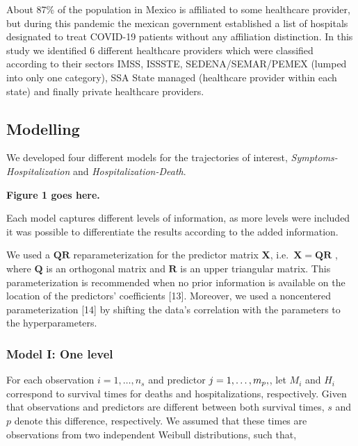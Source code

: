 \documentclass[10pt,letterpaper]{article}
\begin{document}
About 87\% of the population in Mexico is affiliated to some healthcare
provider, but during this pandemic the mexican government established a
list of hospitals designated to treat COVID-19 patients without any
affiliation distinction. In this study we identified 6 different
healthcare providers which were classified according to their sectors
IMSS, ISSSTE, SEDENA/SEMAR/PEMEX (lumped into only one category), SSA
State managed (healthcare provider within each state) and finally
private healthcare providers.

\hypertarget{modelling}{%
\subsection{Modelling}\label{modelling}}

We developed four different models for the trajectories of interest,
\emph{Symptoms-Hospitalization} and \emph{Hospitalization-Death}.
\vspace{5mm}

\begin{center}
\textbf{Figure 1 goes here.}
\end{center}

\vspace{5mm}

Each model captures different levels of information, as more levels were
included it was possible to differentiate the results according to the
added information.

We used a \(\mathbf{QR}\) reparameterization for the predictor matrix
\(\mathbf{X}\), i.e.~\(\mathbf{X}=\mathbf{QR}\) , where \(\mathbf{Q}\)
is an orthogonal matrix and \(\mathbf{R}\) is an upper triangular
matrix. This parameterization is recommended when no prior information
is available on the location of the predictors' coefficients {[}13{]}.
Moreover, we used a noncentered parameterization {[}14{]} by shifting
the data's correlation with the parameters to the hyperparameters.

\hypertarget{model-i-one-level}{%
\subsubsection{Model I: One level}\label{model-i-one-level}}

For each observation \(i=1,\dots,n_s\) and predictor
\(j = 1,\dots,m_p, \space\), let \(M_i\) and \(H_i\) correspond to
survival times for deaths and hospitalizations, respectively. Given that
observations and predictors are different between both survival times,
\(s\) and \(p\) denote this difference, respectively. We assumed that
these times are observations from two independent Weibull distributions,
such that,
\end{document}
